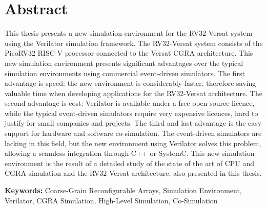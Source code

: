 
\section*{Abstract}


This thesis presents a new simulation environment for the RV32-Versat system
using the Verilator simulation framework. The RV32-Versat system consists of the
PicoRV32 RISC-V processor connected to the Versat \ac{CGRA} architecture. This new 
simulation environment presents significant advantages over
the typical simulation environments using commercial event-driven
simulators. The first advantage is speed: the new environment is considerably
faster, therefore saving valuable time when developing applications for the
RV32-Versat architecture. The second advantage is cost: Verilator is available
under a free open-source licence, while the typical event-driven simulators
require very expensive licences, hard to justify for small companies and
projects. The third and last advantage is the easy support for hardware and
software co-simulation. The event-driven simulators are lacking in this field,
but the new environment using Verilator solves this problem, allowing a seamless
integration through C++ or SystemC. This new simulation environment is the
result of a detailed study of the state of the art of \ac{CPU} and \ac{CGRA}
simulation and the RV32-Versat architecture, also presented in this thesis.

\vfill

\textbf{\Large Keywords:}  Coarse-Grain Reconfigurable Arrays, Simulation Environment, 
Verilator, CGRA Simulation, High-Level Simulation, 
Co-Simulation


